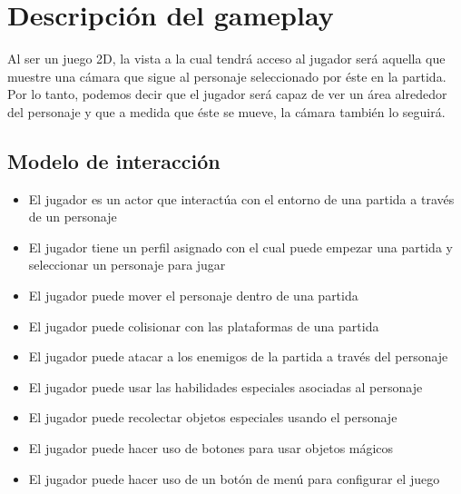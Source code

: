 \section{Descripción del gameplay} %



Al ser un juego 2D, la vista a la cual tendrá acceso al jugador será aquella que
muestre una cámara que sigue al personaje seleccionado por éste en la partida.
Por lo tanto, podemos decir que el jugador será capaz de ver un área alrededor
del personaje y que a medida que éste se mueve, la cámara también lo seguirá.

\subsection{Modelo de interacción}


\begin{itemize}
    \item El jugador es un actor que interactúa con el entorno de una partida a
    través de un personaje
    \item El jugador tiene un perfil asignado con el cual puede empezar una
    partida y seleccionar un personaje para jugar
    \item El jugador puede mover el personaje dentro de una partida
    \item El jugador puede colisionar con las plataformas de una partida
    \item El jugador puede atacar a los enemigos de la partida a través del
    personaje
    \item El jugador puede usar las habilidades especiales asociadas al
    personaje
    \item El jugador puede recolectar objetos especiales usando el personaje
    \item El jugador puede hacer uso de botones para usar objetos mágicos
    \item El jugador puede hacer uso de un botón de menú para configurar el
    juego
\end{itemize}

